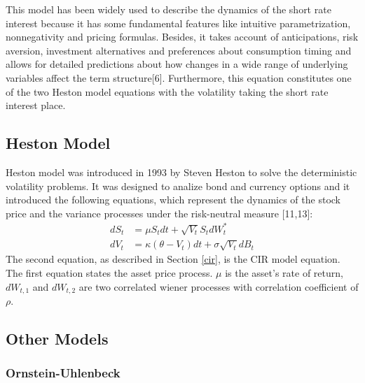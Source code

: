\documentclass[12pt,twoside]{reedthesis}
\theoremstyle{definition}
\theoremstyle{definition}
\theoremstyle{remark}
\begin{document}
  This model has been widely used to describe the dynamics of the short
  rate interest because it has some fundamental features like intuitive
  parametrization, nonnegativity and pricing formulas. Besides, it takes
  account of anticipations, risk aversion, investment alternatives and
  preferences about consumption timing and allows for detailed predictions
  about how changes in a wide range of underlying variables affect the
  term structure{[}6{]}. Furthermore, this equation constitutes one of the
  two Heston model equations with the volatility taking the short rate
  interest place.
  
  \subsection{Heston Model}\label{hes1}
  
  Heston model was introduced in 1993 by Steven Heston to solve the
  deterministic volatility problems. It was designed to analize bond and
  currency options and it introduced the following equations, which
  represent the dynamics of the stock price and the variance processes
  under the risk-neutral measure {[}11,13{]}:
  \begin{align}
  \label{eq:heston}
  dS_t &= \mu S_t dt + \sqrt{V_t} S_t dW^*_t \\
  dV_t &=  \kappa (\theta - V_t)dt + \sigma \sqrt{V_t} dB_t
  \label{eq:hesvar}
  \end{align}
  The second equation, as described in Section \ref{cir}, is the CIR model
  equation. The first equation states the asset price process. \(\mu\) is
  the asset's rate of return, \(dW_{t,1}\) and \(dW_{t,2}\) are two
  correlated wiener processes with correlation coefficient of \(\rho\).
  
  \subsection{Other Models}\label{other-models}
  
  \subsubsection{Ornstein-Uhlenbeck}\label{ornstein-uhlenbeck}
  
\end{document}
